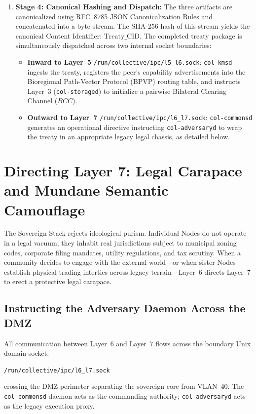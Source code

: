 \begin{enumerate}
  \item \textbf{Stage 4: Canonical Hashing and Dispatch:}
  The three artifacts are canonicalized using RFC~8785 JSON Canonicalization Rules and concatenated into a byte stream. The SHA-256 hash of this stream yields the canonical Content Identifier: $\mathrm{Treaty\_CID}$. The completed treaty package is simultaneously dispatched across two internal socket boundaries:
  \begin{itemize}
    \item \textbf{Inward to Layer~5}\newline
    \texttt{/run/collective/ipc/l5\_l6.sock}: \texttt{col-kmsd} ingests the treaty, registers the peer's capability advertisements into the Bioregional Path-Vector Protocol (BPVP) routing table, and instructs Layer~3 (\texttt{col-storaged}) to initialize a pairwise Bilateral Clearing Channel ($BCC$).
    \item \textbf{Outward to Layer~7}\newline
    \texttt{/run/collective/ipc/l6\_l7.sock}: \texttt{col-commonsd} generates an operational directive instructing \texttt{col-adversaryd} to wrap the treaty in an appropriate legacy legal chassis, as detailed below.
  \end{itemize}
\end{enumerate}

\section[Directing Layer 7: Legal Carapace]{Directing Layer 7: Legal Carapace and Mundane Semantic Camouflage}

The Sovereign Stack rejects ideological purism. Individual Nodes do not operate in a legal vacuum; they inhabit real jurisdictions subject to municipal zoning codes, corporate filing mandates, utility regulations, and tax scrutiny. When a community decides to engage with the external world---or when sister Nodes establish physical trading interties across legacy terrain---Layer~6 directs Layer~7 to erect a protective legal carapace.

\subsection{Instructing the Adversary Daemon Across the DMZ}

All communication between Layer~6 and Layer~7 flows across the boundary Unix domain socket:
\begin{center}
\texttt{/run/collective/ipc/l6\_l7.sock}
\end{center}
crossing the DMZ perimeter separating the sovereign core from VLAN~40. The \texttt{col-commonsd} daemon acts as the commanding authority; \texttt{col-adversaryd} acts as the legacy execution proxy.

